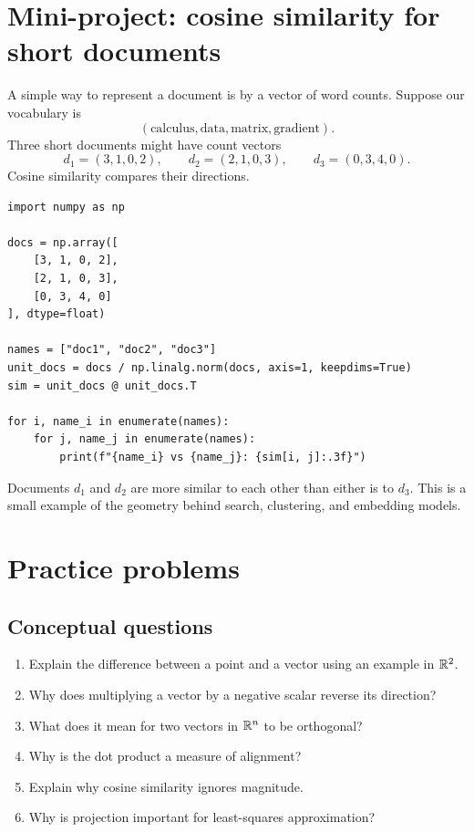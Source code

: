 \section{Mini-project: cosine similarity for short documents}

A simple way to represent a document is by a vector of word counts. Suppose our vocabulary is
\[
  (\text{calculus},\text{data},\text{matrix},\text{gradient}).
\]
Three short documents might have count vectors
\[
  d_1=(3,1,0,2), \qquad d_2=(2,1,0,3), \qquad d_3=(0,3,4,0).
\]
Cosine similarity compares their directions.

\begin{lstlisting}[style=pythonstyle]
import numpy as np

docs = np.array([
    [3, 1, 0, 2],
    [2, 1, 0, 3],
    [0, 3, 4, 0]
], dtype=float)

names = ["doc1", "doc2", "doc3"]
unit_docs = docs / np.linalg.norm(docs, axis=1, keepdims=True)
sim = unit_docs @ unit_docs.T

for i, name_i in enumerate(names):
    for j, name_j in enumerate(names):
        print(f"{name_i} vs {name_j}: {sim[i, j]:.3f}")
\end{lstlisting}

Documents $d_1$ and $d_2$ are more similar to each other than either is to $d_3$. This is a small example of the geometry behind search, clustering, and embedding models.

\section{Practice problems}

\subsection*{Conceptual questions}

\begin{enumerate}
\item Explain the difference between a point and a vector using an example in $\mathbb{R}^2$.
\item Why does multiplying a vector by a negative scalar reverse its direction?
\item What does it mean for two vectors in $\mathbb{R}^n$ to be orthogonal?
\item Why is the dot product a measure of alignment?
\item Explain why cosine similarity ignores magnitude.
\item Why is projection important for least-squares approximation?
\end{enumerate}

